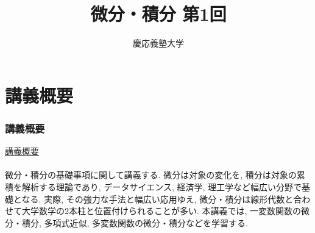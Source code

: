 \documentclass[dvipdfmx,cjk,10.2pt]{beamer}
\theoremstyle{definition}
\begin{document}
\title{微分・積分 第1回} 
\author{慶応義塾大学}            %
\date{}



\begin{frame}                  %
\titlepage                     %
\end{frame}









\section{講義概要}

\begin{frame}
\frametitle{講義概要}   

\underline{講義概要} \\
\ \\

微分・積分の基礎事項に関して講義する. 
微分は対象の変化を, 積分は対象の累積を解析する理論であり, データサイエンス, 経済学, 理工学など幅広い分野で基礎となる. 
実際, その強力な手法と幅広い応用ゆえ, 微分・積分は線形代数と合わせて大学数学の2本柱と位置付けられることが多い. 
本講義では, 一変数関数の微分・積分, 多項式近似, 多変数関数の微分・積分などを学習する. 





\end{frame}
\end{document}
